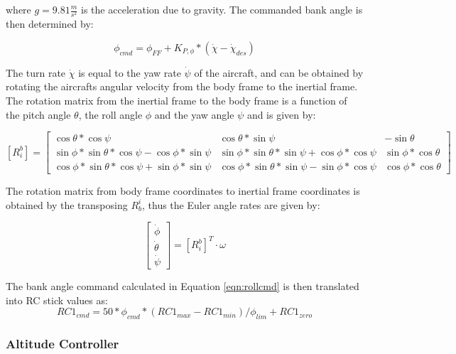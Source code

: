 \documentclass{aiaa}
\begin{document}
where $g=9.81 \frac{m}{s^2}$ is the acceleration due to gravity. The commanded bank angle is then determined by:

\begin{equation}
\label{eqn:rollcmd}
	\phi_{cmd} = \phi_{FF} + K_{P,\phi}*(\dot{\chi} - \dot{\chi}_{des})
\end{equation}

The turn rate $\dot{\chi}$ is equal to the yaw rate $\dot{\psi}$ of the aircraft, and can be obtained by rotating the aircrafts angular velocity from the body frame to the inertial frame. The rotation matrix from the inertial frame to the body frame is a function of the pitch angle $\theta$, the roll angle $\phi$ and the yaw angle $\psi$ and is given by:


\begin{equation}
\label{eqn:rot_mat}
[R_i^b] = 
	\begin{bmatrix}
		\cos{\theta}*\cos{\psi} & \cos{\theta}*\sin{\psi} & 					-\sin{\theta}\\
		\sin{\phi}* \sin{\theta}*\cos{\psi} - \cos{\phi}*\sin{\psi} & 			\sin{\phi}* \sin{\theta}*\sin{\psi} + \cos{\phi}*\cos{\psi} & 			\sin{\phi}*\cos{\theta} \\
		\cos{\phi}* \sin{\theta}*\cos{\psi} + \sin{\phi}*\sin{\psi} & 			\cos{\phi}* \sin{\theta}*\sin{\psi} - \sin{\phi}*\cos{\psi} & 			\cos{\phi}*\cos{\theta} 
	\end{bmatrix}
\end{equation}


The rotation matrix from body frame coordinates to inertial frame coordinates is obtained by the transposing $R_b^i$, thus the Euler angle rates are given by:

\begin{equation}
	\begin{bmatrix}
    \dot{\phi}\\
    \dot{\theta}\\
    \dot{\psi}
    \end{bmatrix}
    =[R_i^b]^T\cdot \omega
\end{equation}

The bank angle command calculated in Equation \eqref{eqn:rollcmd} is then translated into RC stick values as:
\begin{equation}
RC1_{cmd} = 50*\phi_{cmd}*(RC1_{max} - RC1_{min})/\phi_{lim} + RC1_{zero}
\end{equation}

\subsubsection{Altitude Controller}
\end{document}
